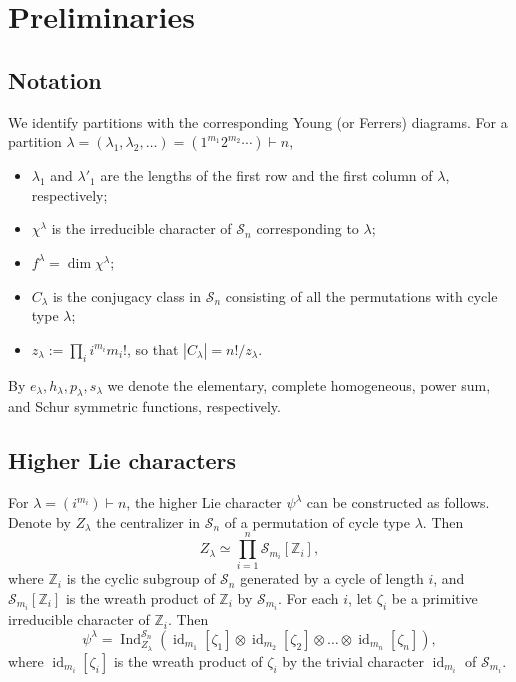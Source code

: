 \documentclass[12pt]%
{amsart}
\newcommand{\bbz}{\mathbb{Z}}
\renewcommand\S{{\mathcal S}}
\newcommand{\la}{{\lambda}}
\newcommand{\Ind}{\operatorname{Ind}}
\theoremstyle{plain}
\theoremstyle{definition}
\newtheorem{definition}[theorem]{Definition}
\theoremstyle{remark}
\newcommand{\id}{{\operatorname{id}}}
\begin{document}
\section{Preliminaries}\label{sec:preliminaries}


\subsection{Notation}

We identify partitions with the corresponding Young (or Ferrers) diagrams.
For a 
partition
$\la = (\la_1, \la_2, \dots) = (1^{m_1} 2^{m_2} \cdots) \vdash n$,
\begin{itemize}
    \item 
    $\la_1$ and $\la'_1$ are the lengths of the first row and the first column of $\la$, respectively;
    \item 
    $\chi^\la$ is the irreducible character of $\S_n$ corresponding to $\la$;
    \item 
    $f^\la=\dim\chi^\la$;
    \item 
    $C_\la$ is the conjugacy class in $\S_n$ consisting of all the permutations with cycle type $\la$;
    \item 
    $z_\la:=\prod_ii^{m_i}m_i!$, so that $|C_\la| = n! / z_\la$.
\end{itemize}
 
By $e_\la, h_\la, p_\la, s_\la$ we denote the elementary, complete homogeneous, power sum, and Schur symmetric functions, respectively.



\subsection{Higher Lie characters}\label{sec:hLc}

For $\la=(i^{m_i})\vdash n$, the higher Lie character $\psi^\la$ can be constructed as follows. 
Denote by $Z_\la$ the centralizer in $\S_n$ of a permutation of cycle type $\la$. Then
\[
    Z_\la
    \simeq \prod_{i=1}^n\S_{m_i}[\bbz_i],
\]
where $\bbz_i$ is the cyclic subgroup of $\S_n$ generated by a cycle of length $i$, and $\S_{m_i}[\bbz_i]$ is the wreath product of $\bbz_i$ by $\S_{m_i}$. For each $i$, let $\zeta_i$ be a primitive irreducible character of $\bbz_i$. Then
\begin{equation}\label{eq:wreathproduct}
     \psi^\la
     = \Ind_{Z_\la}^{\S_n} \left(\id_{m_1}[\zeta_1] \otimes \id_{m_2}[\zeta_2] \otimes \dots \otimes \id_{m_n}[\zeta_n] \right),
\end{equation}
where $\id_{m_i}[\zeta_i]$ is the wreath product of $\zeta_i$ by the trivial character $\id_{m_i}$ of $\S_{m_i}$.
\end{document}
